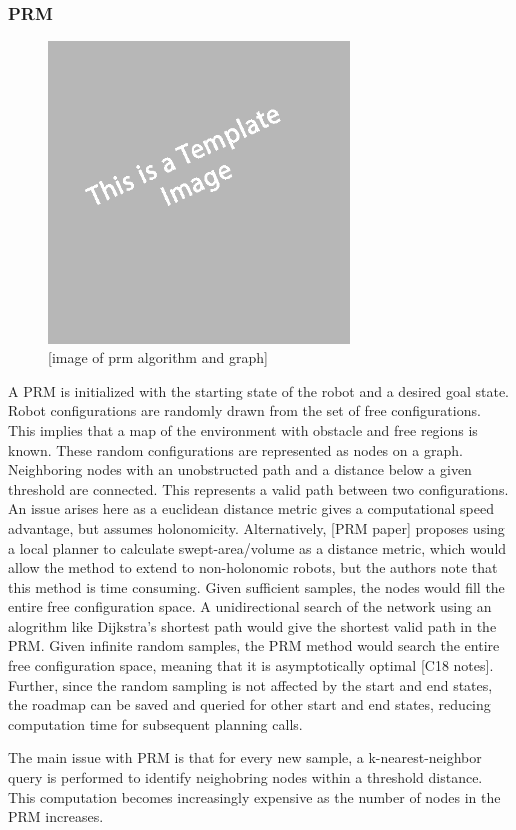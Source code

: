 \documentclass[12pt]{article}
\begin{document}
        \subsubsection{PRM}
            \begin{figure}[ht]
                \includegraphics[width=8cm]{temp}
                \centering
                \caption{[image of prm algorithm and graph]}
            \end{figure}
            A PRM is initialized with the starting state of the robot and a desired goal state. Robot configurations are randomly drawn from the set of free configurations. This implies that a map of the environment with obstacle and free regions is known. These random configurations are represented as nodes on a graph. Neighboring nodes with an unobstructed path and a distance below a given threshold are connected. This represents a valid path between two configurations. An issue arises here as a euclidean distance metric gives a computational speed advantage, but assumes holonomicity. Alternatively, [PRM paper] proposes using a local planner to calculate swept-area/volume as a distance metric, which would allow the method to extend to non-holonomic robots, but the authors note that this method is time consuming. Given sufficient samples, the nodes would fill the entire free configuration space. A unidirectional search of the network using an alogrithm like Dijkstra's shortest path would give the shortest valid path in the PRM. Given infinite random samples, the PRM method would search the entire free configuration space, meaning that it is asymptotically optimal [C18 notes]. Further, since the random sampling is not affected by the start and end states, the roadmap can be saved and queried for other start and end states, reducing computation time for subsequent planning calls. 
            \par The main issue with PRM is that for every new sample, a k-nearest-neighbor query is performed to identify neighobring nodes within a threshold distance. This computation becomes increasingly expensive as the number of nodes in the PRM increases. 
\end{document}
